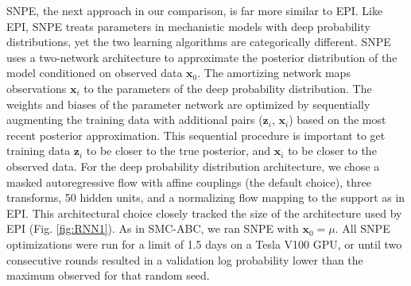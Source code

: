 \documentclass[11pt]{article}
\begin{document}
SNPE, the next approach in our comparison, is far more similar to EPI.
Like EPI, SNPE treats parameters in mechanistic models with deep probability distributions, yet the two learning algorithms are categorically different.
SNPE uses a two-network architecture to approximate the posterior distribution of the model conditioned on observed data $\mathbf{x}_0$.
The amortizing network maps observations $\mathbf{x}_i$ to the parameters of the deep probability distribution. 
The weights and biases of the parameter network are optimized by sequentially augmenting the training data with additional pairs ($\mathbf{z}_i$, $\mathbf{x}_i$) based on the most recent posterior approximation.
This sequential procedure is important to get training data $\mathbf{z}_i$ to be closer to the true posterior, and $\mathbf{x}_i$ to be closer to the observed data.
For the deep probability distribution architecture, we chose a masked autoregressive flow with affine couplings (the default choice), three transforms, 50 hidden units, and a normalizing flow mapping to the support as in EPI.
This architectural choice closely tracked the size of the architecture used by EPI (Fig. \ref{fig:RNN1}).
As in SMC-ABC, we ran SNPE with $\mathbf{x}_0 = \mu$.
All SNPE optimizations were run for a limit of 1.5 days on a Tesla V100 GPU, or until two consecutive rounds resulted in a validation log probability lower than the maximum observed for that random seed.
\end{document}
